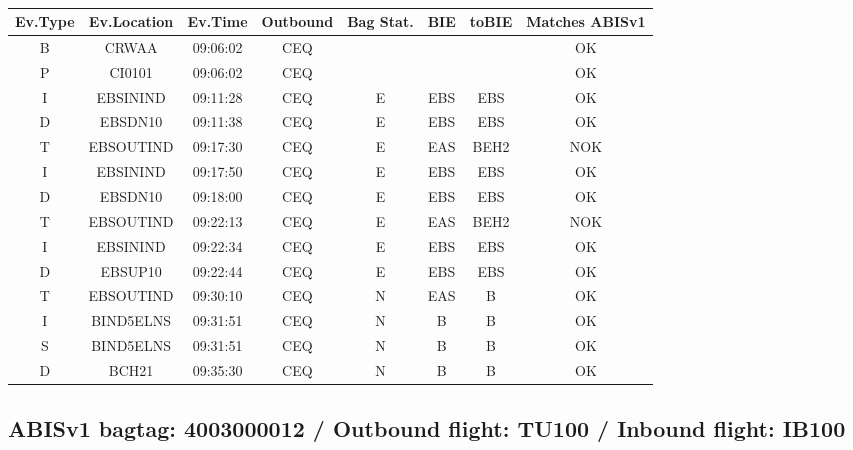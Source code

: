 \documentclass{report}
\begin{document}
\paragraph{}
\begin{longtable}{cccccccc}    \toprule
\rowcolor{white!50}
\textbf{Ev.Type} & \textbf{Ev.Location} & \textbf{Ev.Time} & \textbf{Outbound} & \textbf{Bag Stat.} & \textbf{BIE} & \textbf{toBIE} & \textbf{Matches ABISv1} \\\midrule
B & CRWAA & 09:06:02  & CEQ &  &  &  & OK\\
P & CI0101 & 09:06:02  & CEQ &  &  &  & OK\\
I & EBSININD & 09:11:28  & CEQ & E & EBS & EBS & OK\\
D & EBSDN10 & 09:11:38  & CEQ & E & EBS & EBS & OK\\
T & EBSOUTIND & 09:17:30  & CEQ & E & EAS & BEH2 & NOK\\
I & EBSININD & 09:17:50  & CEQ & E & EBS & EBS & OK\\
D & EBSDN10 & 09:18:00  & CEQ & E & EBS & EBS & OK\\
T & EBSOUTIND & 09:22:13  & CEQ & E & EAS & BEH2 & NOK\\
I & EBSININD & 09:22:34  & CEQ & E & EBS & EBS & OK\\
D & EBSUP10 & 09:22:44  & CEQ & E & EBS & EBS & OK\\
T & EBSOUTIND & 09:30:10  & CEQ & N & EAS & B & OK\\
I & BIND5ELNS & 09:31:51  & CEQ & N & B & B & OK\\
S & BIND5ELNS & 09:31:51  & CEQ & N & B & B & OK\\
D & BCH21 & 09:35:30  & CEQ & N & B & B & OK\\
\bottomrule
\end{longtable}
\subsection*{ABISv1 bagtag: 4003000012 / Outbound flight: TU100 / Inbound flight: IB100}
\end{document}
